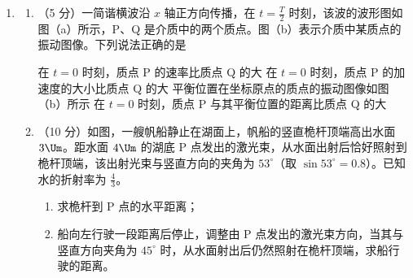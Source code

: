 \documentclass[\gkver]{gaokaozhenti}
\begin{document}
\begin{enumerate}
{（ii）设加热前炉腔的温度为 $T_0$，加热后炉腔温度为 $T_1$，气体压强为 $p_3$。由查理定律得 $\frac{p_3}{T_1}=\frac{p_2}{T_0}$⑤，联立④⑤式并代入题给数据得 $p_3=1.6\times10^{8}\UPa$。
}

\item
\begin{enumerate}
	\item
	（5 分）一简谐横波沿 $x$ 轴正方向传播，在 $t=\frac{T}{2}$ 时刻，该波的波形图如图（a）所示，P、Q 是介质中的两个质点。图（b）表示介质中某质点的振动图像。下列说法正确的是


	{在 $t=0$ 时刻，质点 P 的速率比质点 Q 的大}
	{在 $t=0$ 时刻，质点 P 的加速度的大小比质点 Q 的大}
	{平衡位置在坐标原点的质点的振动图像如图（b）所示}
	{在 $t=0$ 时刻，质点 P 与其平衡位置的距离比质点 Q 的大}
	\item
	（10 分）如图，一艘帆船静止在湖面上，帆船的竖直桅杆顶端高出水面 $3\Um$。距水面 $4\Um$ 的湖底 P 点发出的激光束，从水面出射后恰好照射到桅杆顶端，该出射光束与竖直方向的夹角为 $53^{\circ}$（取 $\sin53^{\circ}=0.8$）。已知水的折射率为 $\frac{4}{3}$。
	\begin{enumerate}
		\item
		求桅杆到 P 点的水平距离；
		\item
		船向左行驶一段距离后停止，调整由 P 点发出的激光束方向，当其与竖直方向夹角为 $45^{\circ}$ 时，从水面射出后仍然照射在桅杆顶端，求船行驶的距离。
	\end{enumerate}

\end{enumerate}

\end{enumerate}
\end{document}
